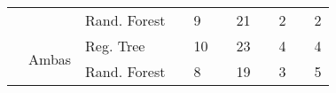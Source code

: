 \begin{table}[]
\begin{tabular}{|l|l|l|l|l|l|l|l|l|l|l|}
                           &                             & Rand. Forest &                      & 9                             &                        & 21                              &                     & 2                             &                       & 2                                                                         \\ \cline{2-11} 
                           & \multirow{2}{*}{Ambas}      & Reg. Tree    &                      & 10                            &                        & 23                              &                     & 4                             &                       & 4                                                                         \\ \cline{3-11} 
                           &                             & Rand. Forest &                      & 8                             &                        & 19                              &                     & 3                             &                       & 5                                                                         \\ \hline
\end{tabular}
\end{table}
